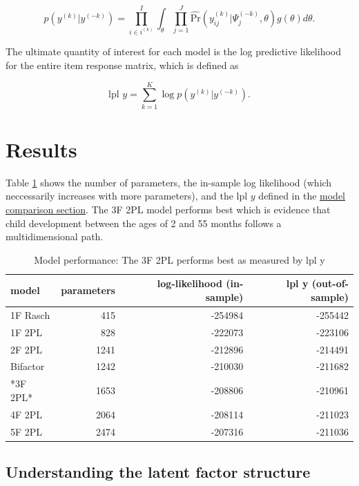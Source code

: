 \documentclass[10pt, letterpaper]{article}
\newenvironment{CodeChunk}{}{}
\begin{document}
\[
p(y^{(k)} | y^{(-k)}) = \prod_{i \in i^{(k)}}^{I} \int_\theta \prod_{j=1}^{J} \hat{\text{Pr}}(y_{ij}^{(k)} | \Psi_j^{(-k)}, \theta) g(\theta)d\theta.
\]

The ultimate quantity of interest for each model is the log predictive
likelihood for the entire item response matrix, which is defined as

\[
\text{lpl } y = \sum_{k = 1}^{K} \log p(y^{(k)} | y^{(-k)}).
\]

\hypertarget{results}{%
\section{Results}\label{results}}

Table \ref{tab:results} shows the number of parameters, the in-sample
log likelihood (which neccessarily increases with more parameters), and
the \(\text{lpl } y\) defined in the
\protect\hyperlink{modelcompare}{model comparison section}. The 3F 2PL
model performs best which is evidence that child development between the
ages of 2 and 55 months follows a multidimensional path.

\begin{CodeChunk}
\begin{table}[!h]

\caption{\label{tab:results}Model performance: The 3F 2PL performs best as measured by lpl y}
\centering
\fontsize{8}{10}\selectfont
\begin{tabular}[t]{l|r|r|r}
\hline
model & parameters & log-likelihood (in-sample) & lpl y (out-of-sample)\\
\hline
1F Rasch & 415 & -254984 & -255442\\
\hline
1F 2PL & 828 & -222073 & -223106\\
\hline
2F 2PL & 1241 & -212896 & -214491\\
\hline
Bifactor & 1242 & -210030 & -211682\\
\hline
*3F 2PL* & 1653 & -208806 & -210961\\
\hline
4F 2PL & 2064 & -208114 & -211023\\
\hline
5F 2PL & 2474 & -207316 & -211036\\
\hline
\end{tabular}
\end{table}

\end{CodeChunk}

\hypertarget{understanding-the-latent-factor-structure}{%
\subsection{Understanding the latent factor
structure}\label{understanding-the-latent-factor-structure}}
\end{document}
